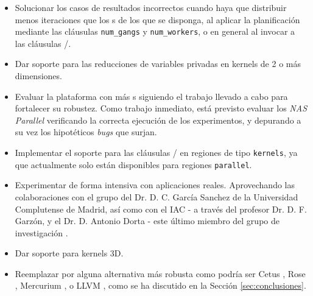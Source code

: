 \begin{itemize}
\item Solucionar los casos de resultados incorrectos cuando haya que distribuir menos 
iteraciones que los \thread{}s de los que se disponga, al aplicar la planificación 
mediante las cláusulas \texttt{num\_gangs} y \texttt{num\_workers}, o en general al 
invocar a las cláusulas \gang{}/\worker{}.
\item Dar soporte para las reducciones de variables privadas en kernels de 2 o más 
dimensiones.
\item Evaluar la plataforma con más \benchmark{}s siguiendo el trabajo llevado a cabo para 
fortalecer su robustez. Como trabajo inmediato, está previsto evaluar los \textit{NAS 
Parallel \benchmark{}} \cite{Bailey:1991:NPB} verificando la correcta ejecución de los 
experimentos, y depurando a su vez los hipotéticos \textit{bugs} que surjan.
\item Implementar el soporte para las cláusulas \gang{}/\worker{} en regiones de tipo 
\texttt{kernels}, ya que actualmente solo están disponibles para regiones 
\texttt{parallel}.
\item Experimentar de forma intensiva con aplicaciones reales. Aprovechando las 
colaboraciones con el grupo del Dr. D. C. García Sanchez de la Universidad Complutense de 
Madrid, así como con 
el \ac{IAC} - a través del profesor Dr. D. F. Garzón, y el Dr. D. Antonio Dorta - este 
último miembro del grupo de 
investigación \GCAP{}.
\item Dar soporte para kernels 3D. 
\item Reemplazar \yacf{} por alguna alternativa más robusta como podría ser Cetus 
\cite{Lee:2003:CEC}, 
Rose \cite{Liao:2010:ESS}, Mercurium \cite{URL::Mercurium}, o LLVM \cite{Guntli:2011:AC}, 
como se ha discutido en la Sección \ref{sec:conclusiones}.
\end{itemize}
